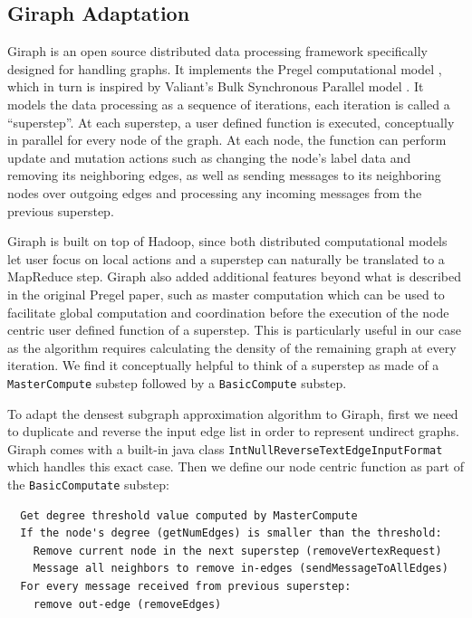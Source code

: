 \documentclass{article}
\begin{document}
\subsection{Giraph Adaptation}
Giraph is an open source distributed data processing framework specifically designed for handling graphs. It implements the Pregel computational model \cite{Malewicz:2010:PSL:1807167.1807184}, which in turn is inspired by Valiant’s Bulk Synchronous Parallel model \cite{Valiant:1990:BMP:79173.79181}. It models the data processing as a sequence of iterations, each iteration is called a ``superstep''. At each superstep, a user defined function is executed, conceptually in parallel for every node of the graph. At each node, the function can perform update and mutation actions such as changing the node's label data and removing its neighboring edges, as well as sending messages to its neighboring nodes over outgoing edges and processing any incoming messages from the previous superstep.

Giraph is built on top of Hadoop, since both distributed computational models let user focus on local actions and a superstep can naturally be translated to a MapReduce step. Giraph also added additional features beyond what is described in the original Pregel paper, such as master computation which can be used to facilitate global computation and coordination before the execution of the node centric user defined function of a superstep. This is particularly useful in our case as the algorithm requires calculating the density of the remaining graph at every iteration. We find it conceptually helpful to think of a superstep as made of a \texttt{MasterCompute} substep followed by a \texttt{BasicCompute} substep.

To adapt the densest subgraph approximation algorithm to Giraph, first we need to duplicate and reverse the input edge list in order to represent undirect graphs. Giraph comes with a built-in java class \texttt{IntNullReverseTextEdgeInputFormat} which handles this exact case. Then we define our node centric function as part of the \texttt{BasicComputate} substep:

\begin{lstlisting}
  Get degree threshold value computed by MasterCompute
  If the node's degree (getNumEdges) is smaller than the threshold:
    Remove current node in the next superstep (removeVertexRequest)
    Message all neighbors to remove in-edges (sendMessageToAllEdges)
  For every message received from previous superstep:
    remove out-edge (removeEdges)
\end{lstlisting}
\end{document}
